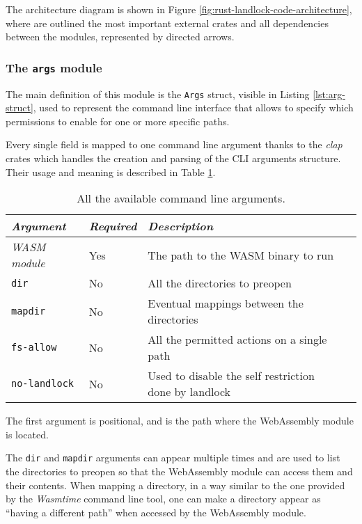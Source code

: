 The architecture diagram is shown in Figure \ref{fig:rust-landlock-code-architecture}, where
are outlined the most important external crates and all dependencies between the modules, represented
by directed arrows.

\subsubsection{The \texttt{args} module}
\label{sec:landlock-args-module}

The main definition of this module is the \texttt{Args} struct, visible in Listing \ref{lst:arg-struct},
used to represent the command line interface that allows to specify which permissions to enable
for one or more specific paths.

Every single field is mapped to one command line argument thanks to the \textit{clap} crates which handles the
creation and parsing of the CLI arguments structure.
Their usage and meaning is described in Table \ref{table:landlock-cli-args}.

\begin{table}
  \centering
  \begin{tabular}{|l|l|l|l|}
    \hline
    \textit{Argument} & \textit{Required} & \textit{Description} \\
    \hline\hline
    \textit{WASM module} & Yes & The path to the WASM binary to run \\ \hline
    \texttt{dir} & No & All the directories to preopen \\ \hline
    \texttt{mapdir} & No & Eventual mappings between the directories \\ \hline
    \texttt{fs-allow} & No & All the permitted actions on a single path \\ \hline
    \texttt{no-landlock} & No & Used to disable the self restriction done by landlock \\
    \hline
  \end{tabular}
  \caption{All the available command line arguments.}
  \label{table:landlock-cli-args}
\end{table}

The first argument is positional, and is the path where the WebAssembly module is located.

The \texttt{dir} and \texttt{mapdir} arguments can appear multiple times and are used to list the directories to preopen
so that the WebAssembly module can access them and their contents.
When mapping a directory, in a way similar to the one provided by the \textit{Wasmtime} command line tool, one can make a
directory appear as ``having a different path'' when accessed by the WebAssembly module.

